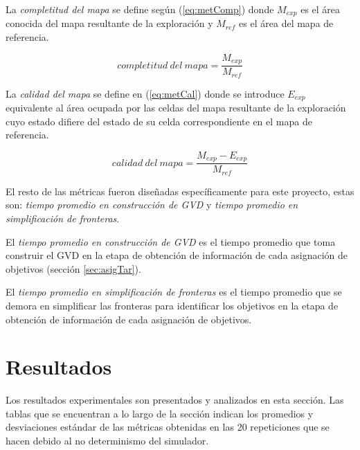 
La \emph{completitud del mapa} se define según (\ref{eq:metComp}) donde
$M_{exp}$ es el área conocida del mapa resultante de la exploración y $M_{ref}$
es el área del mapa de referencia.

\begin{equation} \label{eq:metComp}
completitud\ del\ mapa = \frac{M_{exp}}{M_{ref}}
\end{equation}

La \emph{calidad del mapa} se define en (\ref{eq:metCal}) donde se introduce
$E_{exp}$ equivalente al área ocupada por las celdas del mapa resultante de
la exploración cuyo estado difiere del estado de su celda correspondiente en el
mapa de referencia.

\begin{equation} \label{eq:metCal}
calidad\ del\ mapa = \frac{M_{exp}-E_{exp}}{M_{ref}}
\end{equation}

El resto de las métricas fueron diseñadas específicamente para este proyecto,
estas son: \emph{tiempo promedio en construcción de GVD} y \emph{tiempo
promedio en simplificación de fronteras}.

El \emph{tiempo promedio en construcción de GVD} es el tiempo promedio que toma
construir el GVD en la etapa de obtención de información de cada asignación
de objetivos (sección \ref{sec:asigTar}).

El \emph{tiempo promedio en simplificación de fronteras} es el tiempo promedio
que se demora en simplificar las fronteras para identificar los objetivos en
la etapa de obtención de información de cada asignación de objetivos.

\section{Resultados}
\newlength{\graphlen}
\setlength{\graphlen}{0.75\textwidth}


Los resultados experimentales son presentados y analizados en esta
sección. Las tablas que se encuentran a lo largo de la sección indican los
promedios y desviaciones estándar de las métricas obtenidas en las 20
repeticiones que se hacen debido al no determinismo del simulador.

